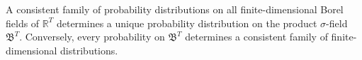 A consistent family of probability distributions on all finite-dimensional Borel fields of $\mathbb{R}^T$ determines a unique probability distribution on the product $\sigma$-field $\mathfrak{B}^T$. Conversely, every probability on $\mathfrak{B}^T$ determines a consistent family of finite-dimensional distributions.
